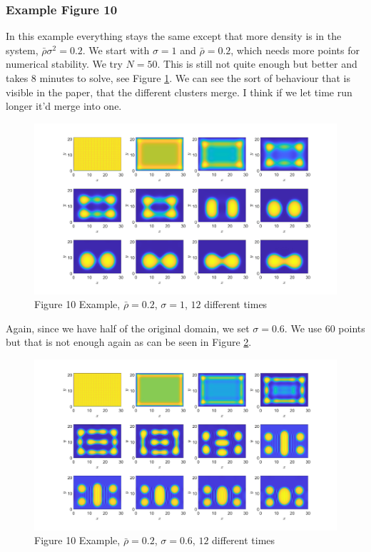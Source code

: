 \documentclass[11pt, a4paper]{article}
\theoremstyle{definition}
\begin{document}
\subsubsection{Example Figure 10}
In this example everything stays the same except that more density is in the system, $\bar \rho \sigma^2 = 0.2$. We start with $\sigma = 1$ and $\bar \rho = 0.2$, which needs more points for numerical stability. We try $N = 50$. This is still not quite enough but better and takes $8$ minutes to solve, see Figure \ref{F4}. We can see the sort of behaviour that is visible in the paper, that the different clusters merge. I think if we let time run longer it'd merge into one.
\begin{figure}[h]
	\centering
	\includegraphics[scale=0.25]{Ex10F1.png}
	\caption{Figure 10 Example, $\bar \rho = 0.2$, $\sigma = 1$, $12$ different times} 
	\label{F4}
\end{figure} 
Again, since we have half of the original domain, we set $\sigma = 0.6$. We use $60$ points but that is not enough again as can be seen in Figure \ref{F4a}.
\begin{figure}[h]
	\centering
	\includegraphics[scale=0.25]{Ex10F2.png}
	\caption{Figure 10 Example, $\bar \rho = 0.2$, $\sigma = 0.6$, $12$ different times} 
	\label{F4a}
\end{figure} 
\end{document}
